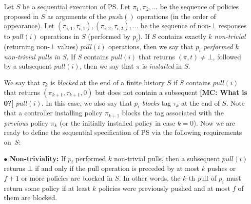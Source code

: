 \documentclass[11pt,pdftex,letter]{article}
\newcommand{\PS}{\textsc{PS}}
\newcommand{\mcnote}[1]{\textcolor{heraldBlue}{\small \bf [MC: #1]}}
\newcommand{\ssnote}[1]{\textcolor{heraldBlue}{\small \bf [SS: #1]}}
\newcommand{\mcnote}[1]{}
\newcommand{\ssnote}[1]{}
\begin{document}
%
Let $S$ be a sequential execution of {\PS}.
Let $\pi_1,\pi_2,\ldots$ be the sequence of policies proposed in $S$
as arguments of the $\textit{push}()$ operations (in the order of appearance).
Let $(\pi_{i,1},\tau_{i,1}),(\pi_{i,2},\tau_{i,2}),\ldots$
be the sequence of non-$\bot$ responses to $\textit{pull}(i)$
operations in $S$ (performed by $p_i$).
%
If $S$ contains exactly $k$ \emph{non-trivial} (returning non-$\bot$ values)
$\textit{pull}(i)$ operations, then we say that $p_i$ \emph{performed $k$
non-trivial pulls in $S$}.
If $S$ contains $\textit{pull}(i)$ that returns $(\pi,t)\neq\bot$,
followed by a subsequent $\textit{pull}(i)$, then we
say that $\pi$ is \emph{installed} in $S$. %

We say that $\tau_k$ is \emph{blocked} at the end of a finite history $S$
if $S$ contains $\textit{pull}(i)$ that
returns $(\pi_{k+1},\tau_{k+1}, 0)$ but does not contain a subsequent
\mcnote{What is 0?}
$\textit{pull}(i)$.
In this case, we also say that $p_i$ \emph{blocks} tag $\tau_{k}$ at the
end of $S$.
Note that a controller installing policy $\pi_{k+1}$ blocks the tag associated
with the \emph{previous} policy $\pi_{k}$ (or the initially installed policy
in case $k=0$).
Now we are ready to define the sequential specification of {\PS}
via the following requirements on~$S$:

\vspace{1.5mm}
\noindent $\bullet$ \textbf{Non-triviality:}
If $p_i$ performed $k$ non-trivial pulls, then
a subsequent $\textit{pull}(i)$ returns $\bot$ if and only if
the pull operation  is preceded by at most $k$ pushes or  $f+1$ or more
policies are blocked in $S$.
In other words, the $k$-th pull of $p_i$ must return some
policy if at least $k$ policies were previously pushed and at most $f$
of them are blocked.
\end{document}
